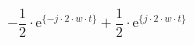 \[
-\frac{1}{2} \cdot \textrm{e}^{ \{-j \cdot 2 \cdot w \cdot t \}}
+\frac{1}{2} \cdot \textrm{e}^{ \{ j \cdot 2 \cdot w \cdot t \}}
\]
